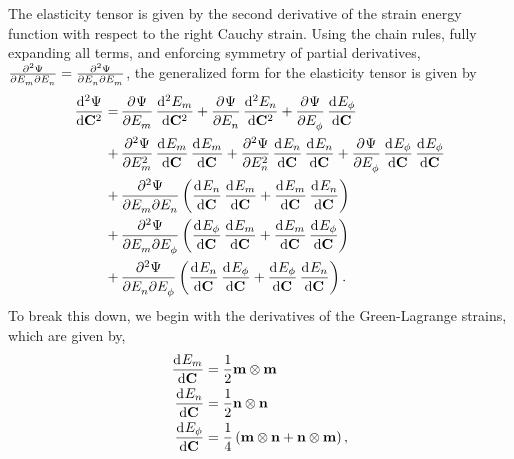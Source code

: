     The elasticity tensor is given by the second derivative of the strain energy function with respect to the right Cauchy strain. Using the chain rules, fully expanding all terms, and enforcing symmetry of partial derivatives, $\md{\Psi}{2}{E_m}{}{E_n}{} = \md{\Psi}{2}{E_n}{}{E_m}{}$, the generalized form for the elasticity tensor is given by 
\begin{equation} \label{eqn:generalizedelasticityform}
\begin{aligned}
\dod[2]{\Psi}{\mathbf{C}} =& 
	\dpd{\Psi}{E_m} \dod[2]{E_m}{\mathbf{C}} 
    + \dpd{\Psi}{E_n} \dod[2]{E_n}{\mathbf{C}}
    + \dpd{\Psi}{E_\phi} \dod{E_\phi}{\mathbf{C}} \\
+& \dpd[2]{\Psi}{E_m} \dod{E_m}{\mathbf{C}}\dod{E_m}{\mathbf{C}} 
	+ \dpd[2]{\Psi}{E_n} \dod{E_n}{\mathbf{C}} \dod{E_n}{\mathbf{C}} 
    + \dpd{\Psi}{E_\phi} \dod{E_\phi}{\mathbf{C}} \dod{E_\phi}{\mathbf{C}} \\
+& \dmd{\Psi}{2}{E_m}{}{E_n}{} \left(\dod{E_n}{\mathbf{C}} \dod{E_m}{\mathbf{C}} + \dod{E_m}{\mathbf{C}} \dod{E_n}{\mathbf{C}}\right)   \\
    +& \dmd{\Psi}{2}{E_m}{}{E_\phi}{} \left(\dod{E_\phi}{\mathbf{C}} \dod{E_m}{\mathbf{C}} + \dod{E_m}{\mathbf{C}} \dod{E_\phi}{\mathbf{C}}\right)  \\
    +& \dmd{\Psi}{2}{E_n}{}{E_\phi}{} \left(\dod{E_n}{\mathbf{C}} \dod{E_\phi}{\mathbf{C}} + \dod{E_\phi}{\mathbf{C}} \dod{E_n}{\mathbf{C}}\right).  \\
\end{aligned}
\end{equation}
To break this down, we begin with the derivatives of the Green-Lagrange strains, which are given by,
\begin{equation}\label{eqn:partialgreens}
\begin{aligned}
\dod{E_m}{\mathbf{C}} &= \frac{1}{2} \mathbf{m}\otimes\mathbf{m}	\\
\dod{E_n}{\mathbf{C}} &= \frac{1}{2} \mathbf{n}\otimes\mathbf{n} \\
\dod{E_\phi}{\mathbf{C}} &= \frac{1}{4} \left(\mathbf{m}\otimes\mathbf{n} + \mathbf{n}\otimes\mathbf{m} \right),
\end{aligned}
\end{equation}
